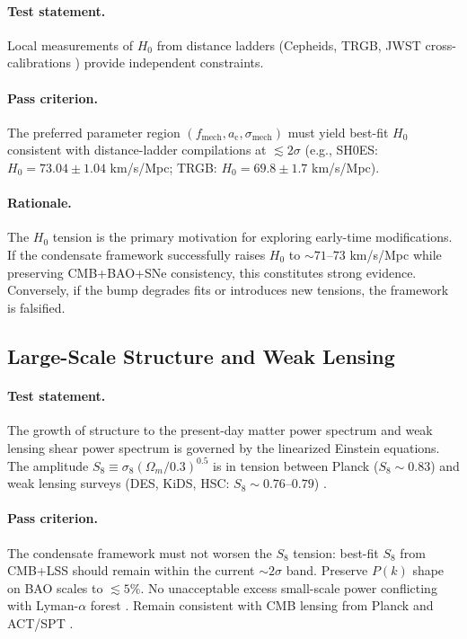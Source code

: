 \documentclass[11pt,a4paper]{article}
\newcommand{\ac}{a_{\mathrm{c}}}
\newcommand{\sigmamech}{\sigma_{\mathrm{mech}}}
\newcommand{\fmech}{f_{\mathrm{mech}}}
\theoremstyle{definition}
\begin{document}
\paragraph{Test statement.}
Local measurements of $H_0$ from distance ladders (Cepheids, TRGB, JWST cross-calibrations \cite{RiessReview2024,Riess2022,FreedmanTRGB2020,JWST_Cepheids2023}) provide independent constraints.

\paragraph{Pass criterion.}
The preferred parameter region $(\fmech, \ac, \sigmamech)$ must yield best-fit $H_0$ consistent with distance-ladder compilations at $\lesssim 2\sigma$ (e.g., SH0ES: $H_0 = 73.04 \pm 1.04$ km/s/Mpc; TRGB: $H_0 = 69.8 \pm 1.7$ km/s/Mpc).

\paragraph{Rationale.}
The $H_0$ tension is the primary motivation for exploring early-time modifications. If the condensate framework successfully raises $H_0$ to $\sim 71$--$73$ km/s/Mpc while preserving CMB+BAO+SNe consistency, this constitutes strong evidence. Conversely, if the bump degrades fits or introduces new tensions, the framework is falsified.

\subsection{Large-Scale Structure and Weak Lensing}
\label{sec:LSS}

\paragraph{Test statement.}
The growth of structure to the present-day matter power spectrum and weak lensing shear power spectrum is governed by the linearized Einstein equations. The amplitude $S_8 \equiv \sigma_8 (\Omega_m/0.3)^{0.5}$ is in tension between Planck ($S_8 \sim 0.83$) and weak lensing surveys (DES, KiDS, HSC: $S_8 \sim 0.76$--$0.79$) \cite{PlanckS8,DES2021,KiDS2020}.

\paragraph{Pass criterion.}
The condensate framework must not worsen the $S_8$ tension: best-fit $S_8$ from CMB+LSS should remain within the current $\sim 2\sigma$ band. Preserve $P(k)$ shape on BAO scales to $\lesssim 5\%$. No unacceptable excess small-scale power conflicting with Lyman-$\alpha$ forest \cite{LymanAlpha}. Remain consistent with CMB lensing from Planck and ACT/SPT \cite{PlanckLensing,ACTLensing}.
\end{document}
